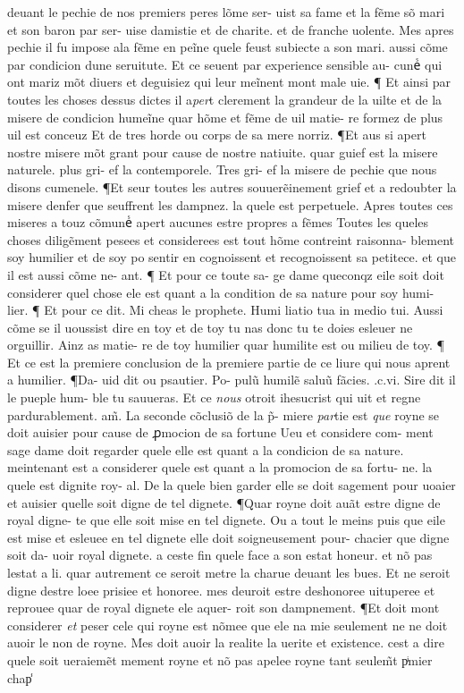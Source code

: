\documentclass{article}
\begin{document}
\begin{pages}
deuant le pechie de nos premiers peres lõme ser- uist sa fame et la fẽme sõ mari et son baron par ser- uise damistie et de charite. et de franche uolente. Mes apres pechie il fu impose ala fẽme en peĩne quele feust subiecte a son mari. aussi cõme par condicion dune seruitute. Et ce seuent par experience sensible au- cuneᷤ qui ont mariz mõt diuers et deguisiez qui leur meĩnent mont male uie. ¶ Et ainsi par toutes les choses dessus dictes il a\textit{per}t clerement la grandeur de la uilte et de la misere de condicion humeĩne quar hõme et fẽme de uil matie- re formez de plus uil est conceuz Et de tres horde ou corps de sa mere norriz. ¶Et aus si apert nostre misere mõt grant pour cause de nostre natiuite. quar guief est la misere naturele. plus gri- ef la contemporele. Tres gri- ef la misere de pechie que nous disons cumenele. ¶Et seur toutes les autres souuerẽinement grief et a redoubter la misere denfer que seuffrent les dampnez. la quele est perpetuele. Apres toutes ces miseres a touz cõmuneᷤ apert aucunes estre propres a fẽmes Toutes les queles choses diligẽment pesees et considerees est tout hõme contreint raisonna- blement soy humilier et de soy po sentir en cognoissent et recognoissent sa petitece. et que il est aussi cõme ne- ant. ¶ Et pour ce toute sa- ge dame queconqz eile soit doit considerer quel chose ele est quant a la condition de sa nature pour soy humi- lier. ¶ Et pour ce dit. Mi cheas le prophete. Humi liatio tua in medio tui. Aussi cõme se il uoussist dire en toy et de toy tu nas donc tu te doies esleuer ne orguillir. Ainz as matie- re de toy humilier quar humilite est ou milieu de toy. ¶ Et ce est la premiere conclusion de la premiere partie de ce liure qui nous aprent a humilier. ¶Da- uid dit ou psautier. Po- pulũ humilẽ saluũ fãcies. .c.vi. Sire dit il le pueple hum- ble tu sauueras. Et ce \textit{nous} otroit ihesucrist qui uit et regne pardurablement. am̃. La seconde cõclusiõ de la p̃- miere \textit{par}tie est \textit{que} royne se doit auisier pour cause de ꝓmocion de sa fortune Ueu et considere com- ment sage dame doit regarder quele elle est quant a la condicion de sa nature. meintenant est a considerer quele est quant a la promocion de sa fortu- ne. la quele est dignite roy- al. De la quele bien garder elle se doit sagement pour uoaier et auisier quelle soit digne de tel dignete. ¶Quar royne doit auãt estre digne de royal digne- te que elle soit mise en tel dignete. Ou a tout le meins puis que eile est mise et esleuee en tel dignete elle doit soigneusement pour- chacier que digne soit da- uoir royal dignete. a ceste fin quele face a son estat honeur. et nõ pas lestat a li. quar autrement ce seroit metre la charue deuant les bues. Et ne seroit digne destre loee prisiee et honoree. mes deuroit estre deshonoree uituperee et reprouee quar de royal dignete ele aquer- roit son dampnement. ¶Et doit mont considerer \textit{et} peser cele qui royne est nõmee que ele na mie seulement ne ne doit auoir le non de royne. Mes doit auoir la realite la uerite et existence. cest a dire quele soit ueraiemẽt mement royne et nõ pas apelee royne tant seulem̃t pͥmier chap̾ 
\end{pages}
\end{document}
